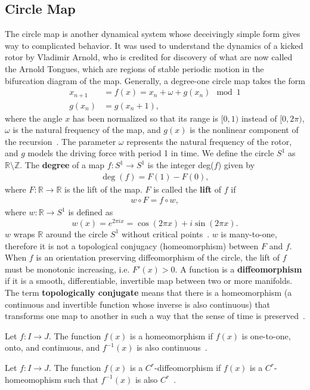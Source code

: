 \subsection{Circle Map}
The circle map is another
dynamical system whose deceivingly simple form gives way to complicated behavior. It was used to
understand the dynamics of a kicked rotor by Vladimir
Arnold, who is credited for discovery of what are now called the Arnold Tongues, which are
regions of stable periodic motion in the bifurcation diagram of the
map. Generally, a degree-one circle map takes the form
\begin{align*}
x_{n+1}&=f(x)=x_n + \omega + g(x_n) \mod 1\\
g(x_n)&=g(x_n + 1),
\end{align*}
where the angle $x$ has been normalized so that its range is $[0,1)$
instead of $[0,2\pi )$, $\omega$ is the natural frequency of the map, and
$g(x)$ is the nonlinear component of the recursion~\cite{rasband}. The
parameter $\omega$ represents the natural frequency of the rotor, and
$g$ models the driving force with period 1 in time. We define the circle $S^1$ as $\mathbb{R} \setminus
\mathbb{Z}$. The \textbf{degree} of a map $f:S^1 \to S^1$ is the integer
deg($f$) given by 
\begin{align*}
\deg(f) = F(1) - F(0),
\end{align*}
where $F:\mathbb{R} \to \mathbb{R}$ is the lift of the
map. $F$ is called the \textbf{lift} of $f$ if
\begin{align*}
w \circ F = f \circ w,
\end{align*}
where $w:\mathbb{R} \to S^1$ is defined as
\begin{equation*}
w(x) = e^{2\pi i x} = \cos(2\pi x) + i\sin(2\pi x).
\end{equation*}
$w$ wraps $\mathbb{R}$ around the circle $S^1$ without critical
points~\cite{devaney}. $w$ is many-to-one, therefore it is not a
topological conjugacy (homeomorphism)
between $F$ and $f$. When $f$ is an orientation
preserving diffeomorphism of the circle, the lift of $f$ must be
monotonic increasing, i.e. $F'(x)>0$. A function is a \textbf{diffeomorphism}
if it is a smooth, differentiable, invertible map between two or more
manifolds. The term \textbf{topologically conjugate} means that there
is a homeomorphism (a continuous and invertible function whose inverse
is also continuous)
that transforms one map to another in such a way that the sense of
time is preserved~\cite{strogatz}.

\begin{singlespacing}
\begin{definition}
Let $f:I \to J$. The function $f(x)$ is a homeomorphism if $f(x)$ is
one-to-one, onto, and continuous, and $f^{-1}(x)$ is also continuous~\cite{devaney}.
\end{definition}
\begin{definition}
Let $f:I\to J$. The function $f(x)$ is a $C^r$-diffeomorphism if
$f(x)$ is a $C^r$-homeomophism such that $f^{-1}(x)$ is also $C^r$~\cite{devaney}. 
\end{definition}
\end{singlespacing}

